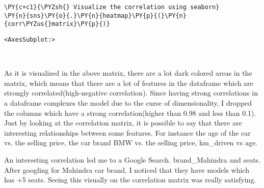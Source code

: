 \begin{tcolorbox}[breakable, size=fbox, boxrule=1pt, pad at break*=1mm,colback=cellbackground, colframe=cellborder]
\begin{Verbatim}[commandchars=\\\{\}]
\PY{c+c1}{\PYZsh{} Visualize the correlation using seaborn}
\PY{n}{sns}\PY{o}{.}\PY{n}{heatmap}\PY{p}{(}\PY{n}{corr\PYZus{}matrix}\PY{p}{)}
\end{Verbatim}
\end{tcolorbox}

\begin{tcolorbox}[breakable, size=fbox, boxrule=.5pt, pad at break*=1mm, opacityfill=0]
\begin{Verbatim}[commandchars=\\\{\}]
<AxesSubplot:>
\end{Verbatim}
\end{tcolorbox}
    \begin{center}
    \end{center}
    { \hspace*{\fill} \\}
    
As it is visualized in the above matrix, there are a lot dark colored areas in
the matrix, which means that there are a lot of features in the dataframe which are
strongly correlated(high-negative correlation). Since having strong correlations
in a dataframe complexes the model due to the curse of dimensionality, I dropped
the columns which have a strong correlation(higher than 0.98 and less than 0.1). Just by looking at the correlation
matrix, it is possible to say that there are interesting relationships between some
features. For instance the age of the car vs. the selling price, the car brand BMW vs.
the selling price, km\_driven vs age. 

An interesting correlation led me to a Google Search. brand\_Mahindra and seats. After
googling for Mahindra car brand, I noticed that they have models which has +5 seats.
Seeing this visually on the correlation matrix was really satisfying.

\newpage


